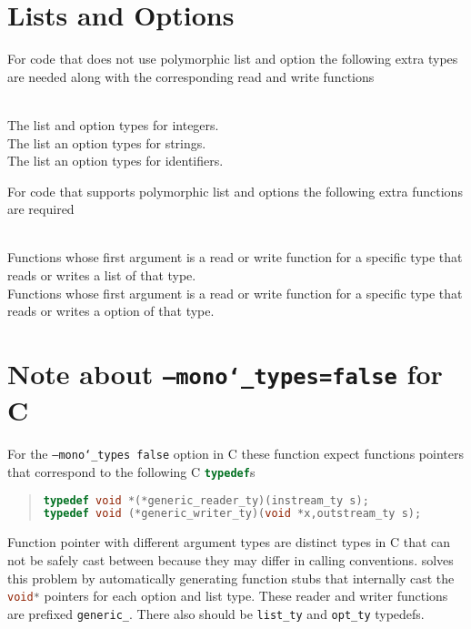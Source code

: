 \section{Lists and Options}
For code that does not use polymorphic list and option the following extra
types are needed along with the corresponding read and write functions
\begin{description}
   \mbox{}\\
    The list and option types for integers.
   \mbox{}\\
    The list an option types for strings.
   \mbox{}\\
    The list an option types for identifiers.
\end{description}%

For code that supports polymorphic list and options the following extra
functions are required

\begin{description}
   \mbox{}\\
    Functions whose first argument is a read or write
    function for a specific type that reads or writes a list of that type.
   \mbox{}\\
    Functions whose first argument is a read or write
    function for a specific type that reads or writes a option of that type.
\end{description}%

\section{Note about \texttt{--mono\char`\_types=false} for C}
For the \texttt{--mono\char`\_types false} option in C these function expect functions
pointers that correspond to the following C \lstinline[language=c]!typedef!s
%
\begin{quote}\begin{lstlisting}[language=c]
typedef void *(*generic_reader_ty)(instream_ty s);
typedef void (*generic_writer_ty)(void *x,outstream_ty s);
\end{lstlisting}\end{quote}%

Function pointer with different argument types are distinct types in C that
can not be safely cast between because they may differ in calling
conventions. \asdlgen{} solves this problem by automatically generating
function stubs that internally cast the \lstinline[language=c]!void*! pointers for each option
and list type. These reader and writer functions are prefixed
\lstinline[language=c]!generic_!. There also should be \lstinline[language=c]!list_ty!
and \lstinline[language=c]!opt_ty! typedefs.
